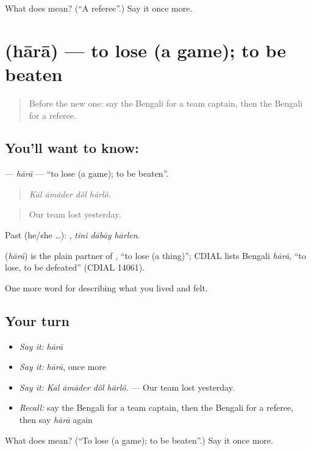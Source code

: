 \begin{tcolorbox}[breakable,colback=teal!4,colframe=teal!35!black,title={Before you move on}]
What does  mean? (\textquotedblleft{}A referee\textquotedblright{}.) Say it once more.
\end{tcolorbox}
\section[\texorpdfstring{\bn{হারা} (hārā)}{হারা (hārā)}]{ (hārā) — to lose (a game); to be beaten}

\label{lesson:BN-C519-hara}



\begin{quote}
Before the new one: say the Bengali for a team captain, then the Bengali for a referee.
\end{quote}

\subsection*{You'll want to know: }
\textbf{} — \emph{hārā} — \textquotedblleft{}to lose (a game); to be beaten\textquotedblright{}.

\begin{quote}
   
\end{quote}

\begin{quote}
\emph{Kāl āmāder dôl hārlô.}
\end{quote}

\begin{quote}
Our team lost yesterday.
\end{quote}

Past (he/she …):   , \emph{tini dābāy hārlen}.

\begin{cousinweb}
\textbf{} (\emph{hārā}) is the plain partner of , \textquotedblleft{}to lose (a thing)\textquotedblright{}; CDIAL lists Bengali \emph{hārā}, \textquotedblleft{}to lose, to be defeated\textquotedblright{} (CDIAL 14061).
\end{cousinweb}

\begin{grammarlens}[title={What you've built}]
One more word for describing what you lived and felt.
\end{grammarlens}

\subsection*{Your turn}
\begin{itemize}
\raggedright
  \item \emph{Say it:} \emph{hārā}
  \item \emph{Say it:} \emph{hārā}, once more
  \item \emph{Say it:} \emph{Kāl āmāder dôl hārlô.} — Our team lost yesterday.
  \item \emph{Recall:} say the Bengali for a team captain, then the Bengali for a referee, then say \emph{hārā} again
\end{itemize}

\begin{tcolorbox}[breakable,colback=teal!4,colframe=teal!35!black,title={Before you move on}]
What does  mean? (\textquotedblleft{}To lose (a game); to be beaten\textquotedblright{}.) Say it once more.
\end{tcolorbox}
